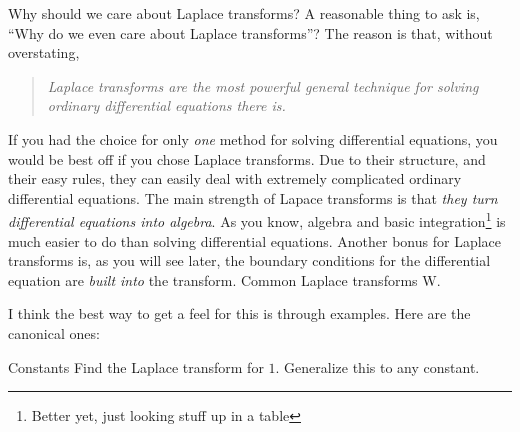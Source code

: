 \documentclass[11pt]{article}
\theoremstyle{mystyle}
\begin{document}
\begin{psmotivation}{Why should we care about Laplace transforms?}{}
    A reasonable thing to ask is, ``Why do we even care about
    Laplace transforms''? The reason is that, without overstating,
    \begin{quote}
        \emph{Laplace transforms are the most powerful general technique
        for solving ordinary differential equations there is.}
    \end{quote}
    If you had the choice for only \emph{one} method for solving
    differential equations, you would be best off if you chose
    Laplace transforms. Due to their structure, and their
    easy rules, they can easily deal with extremely complicated
    ordinary differential equations.
    The main strength of Lapace transforms is
    that \emph{they turn differential equations
    into algebra}. As you know, algebra and basic
    integration\footnote{Better yet, just looking
    stuff up in a table} is much easier to do than solving
    differential equations. Another bonus for Laplace
    transforms is, as you will see later, the boundary
    conditions for the differential equation are \emph{built
    into} the transform. Common Laplace transforms W.
\end{psmotivation}

\noin
\color{black} I think the best way to get a feel for this
is through examples. Here are the canonical ones:

\begin{psexample}{Constants}{}
        Find the Laplace transform for $1$. Generalize this
        to any constant.
\end{psexample}
\end{document}
